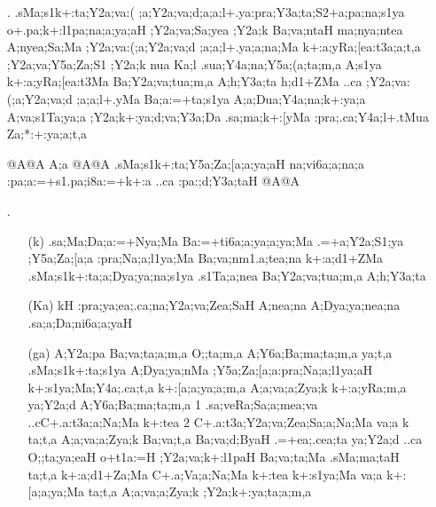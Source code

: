 \begin{spacing}{1.15}
\begin{itemize}
\begin{itemize}
    \end{itemize}
 
 \item[{\sktf 9}.] {\sktf .sMa;s1k+:ta\ZF{-};Y2a;va:(%
;a;Y2a;va;d;a;a;l+.ya\ZF{-}:pra;Y3a;ta;S2+a;pa;na;s1ya
o+.pa;k+:l1pa;na;a;ya;aH ;Y2a;va;Sa;yea ;Y2a;k
Ba;va;ntaH ma;nya;ntea  A;nyea;Sa;Ma ;Y2a;va:(;a;Y2a;va;d%
;a;a;l+.ya;a;na;Ma k+:a;yRa;[ea:t3a;a;t,a
;Y2a;va;Y5a;Za;S1 ;Y2a;k nua Ka;l
.sua;Y4a;na;Y5a;(a;ta;m,a A;s1ya k+:a;yRa;[ea:t3Ma
Ba;Y2a;va;tua;m,a A;h;Y3a;ta  h;d1+ZMa ..ca ;Y2a;va:(;a;Y2a;va;d%
;a;a;l+.yMa Ba;a:=+ta;s1ya A;a;Dua;Y4a;na;k+:ya;a A;va;s1Ta;ya;a
;Y2a;k+:ya;d;va;Y3a;Da .sa;ma;k+:[yMa :pra;.ca;Y4a;l+.tMua
Za;*:+:ya;a;t,a } 
   
 {\sktb {}@A@A A;a @A@A .sMa;s1k+:ta;Y5a;Za;[a;a;ya;aH na;vi6a;a;na;a
:pa;a:=+s1.pa;i8a:=+k+:a ..ca :pa:;d;Y3a;taH%
 @A@A}


\item[{\sktf 10 }.] \begin{itemize}
   \item[({\sktf k})] {\sktf .sa;Ma;Da;a:=+Nya;Ma Ba:=+ti6a;a;ya;a;ya;Ma
.=+a;Y2a;S1;ya ;Y5a;Za;[a;a :pra;Na;a;l1ya;Ma
Ba;va;nm1.a;tea;na k+:a;d1+ZMa
.sMa;s1k+:ta;a;Dya;ya;na;s1ya .s1Ta;a;nea Ba;Y2a;va;tua;m,a
A;h;Y3a;ta }
            
   \item[({\sktf Ka})] {\sktf kH :pra;ya;ea;.ca;na;Y2a;va;Zea;SaH%
 A;nea;na A;Dya;ya;nea;na .sa;a;Da;ni6a;a;yaH }
            
    \item[({\sktf ga})] {\sktf A;Y2a;pa Ba;va;ta;a;m,a O;;ta;m,a
A;Y6a;Ba;ma;ta;m,a\ZF{,} ya;t,a .sMa;s1k+:ta;s1ya
A;Dya;ya;nMa ;Y5a;Za;[a;a\ZF{-}:pra;Na;a;l1ya;aH k+:s1ya;Ma;Y4a;.ca;t,a
k+:[a;a;ya;a;m,a A;a;va;a;Zya;k k+:a;yRa;m,a
 ya;Y2a;d A;Y6a;Ba;ma;ta;m,a\ZF{,} \ZF{(}1\ZF{)} .sa;veRa;Sa;a;mea;va
..cC+.a:t3a;a;Na;Ma k+:tea\ZF{,} \ZF{(}2\ZF{)}
C+.a:t3a;Y2a;va;Zea;Sa;a;Na;Ma va;a k\ZF{,} ta;t,a A;a;va;a;Zya;k Ba;va;t,a\ZF{,}
Ba;va;d;ByaH .=+ea;.cea;ta  ya;Y2a;d ..ca O;;ta;ya;eaH
o+t1a:=H ;Y2a;va;k+:l1paH Ba;va;ta;Ma
.sMa;ma;taH\ZF{,} ta;t,a k+:a;d1+Za;Ma C+.a;Va;a;Na;Ma
k+:tea\ZF{,} k+:s1ya;Ma va;a k+:[a;a;ya;Ma\ZF{,} ta;t,a
A;a;va;a;Zya;k ;Y2a;k+:ya;ta;a;m,a
} 
            

\end{itemize}
\end{itemize}
\end{spacing}
